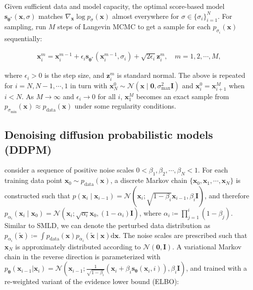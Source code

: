 Given sufficient data and model capacity, the optimal score-based model $\mathbf{s}_{{\boldsymbol{\theta}}^*}(\mathbf{x}, \sigma)$ matches $\nabla_\mathbf{x} \log p_{\sigma}(\mathbf{x})$ almost everywhere for $\sigma \in \{\sigma_i\}_{i=1}^{N}$. For sampling, \citet{song2019generative} run $M$ steps of Langevin MCMC to get a sample for each $p_{\sigma_i}(\mathbf{x})$ sequentially:

\begin{align}
    \mathbf{x}_i^m = \mathbf{x}_i^{m-1} + \epsilon_i \mathbf{s}_{{\boldsymbol{\theta}}^*}(\mathbf{x}_i^{m-1}, \sigma_{i}) + \sqrt{2\epsilon_i} \mathbf{z}_{i}^m,\quad m=1,2,\cdots, M,\label{eqn:langevin}
\end{align}

where $\epsilon_i > 0$ is the step size, and $\mathbf{z}_i^m$ is standard normal. The above is repeated for $i=N, N-1, \cdots, 1$ in turn with $\mathbf{x}_{N}^0 \sim \mathcal{N}(\mathbf{x} \mid \mathbf{0}, \sigma_{\text{max}}^2 \mathbf{I})$ and $\mathbf{x}_i^0 = \mathbf{x}_{i+1}^{M}$ when $i < N$. As $M \to \infty$ and $\epsilon_i \to 0$ for all $i$, $\mathbf{x}_1^M$ becomes an exact sample from $p_{\sigma_{\text{min}}}(\mathbf{x}) \approx p_{\mathrm{data}}(\mathbf{x})$ under some regularity conditions.

\subsection{Denoising diffusion probabilistic models (DDPM)}\label{sec:ddpm}
\citet{sohl2015deep,ho2020denoising} consider a sequence of positive noise scales $0 < \beta_1, \beta_2, \cdots, \beta_N < 1$. For each training data point $\mathbf{x}_0 \sim p_{\mathrm{data}}(\mathbf{x})$, a discrete Markov chain $\{ \mathbf{x}_0, \mathbf{x}_1, \cdots, \mathbf{x}_N \}$ is constructed such that $p(\mathbf{x}_{i} \mid \mathbf{x}_{i-1}) = \mathcal{N}(\mathbf{x}_{i} ; \sqrt{1-\beta_i} \mathbf{x}_{i-1}, \beta_i \mathbf{I})$, and therefore $p_{\alpha_i}(\mathbf{x}_i \mid \mathbf{x}_0) = \mathcal{N}(\mathbf{x}_i ;\sqrt{\alpha_i} \mathbf{x}_0, (1-\alpha_i)\mathbf{I})$, where $\alpha_i \coloneqq \prod_{j=1}^i (1-\beta_j)$. Similar to SMLD, we can denote the perturbed data distribution as $p_{\alpha_i}(\tilde{\mathbf{x}}) \coloneqq \int p_\text{data}(\mathbf{x}) p_{\alpha_i}(\tilde{\mathbf{x}} \mid \mathbf{x}) \mathrm{d} \mathbf{x}$. The noise scales are prescribed such that 
$\mathbf{x}_N$ is approximately distributed according to $\mathcal{N}(\mathbf{0}, \mathbf{I})$. A variational Markov chain in the reverse direction is parameterized with $p_{\boldsymbol{\theta}}(\mathbf{x}_{i-1} | \mathbf{x}_{i}) = \mathcal{N}(\mathbf{x}_{i-1}; \frac{1}{\sqrt{1-\beta_i}} (\mathbf{x}_i + \beta_i \mathbf{s}_{\boldsymbol{\theta}}(\mathbf{x}_i, i)), \beta_i \mathbf{I})$, and trained with a re-weighted variant of the evidence lower bound (ELBO):

